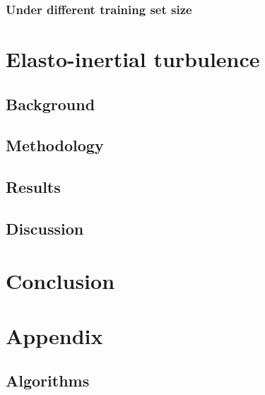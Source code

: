 \documentclass[12pt]{report} %
\begin{document}
\subsection{Under different training set size}

\chapter{Elasto-inertial turbulence}

\section{Background}

\section{Methodology}

\section{Results}

\section{Discussion}

\chapter{Conclusion}


\chapter{Appendix}

\section{Algorithms}
\end{document}
